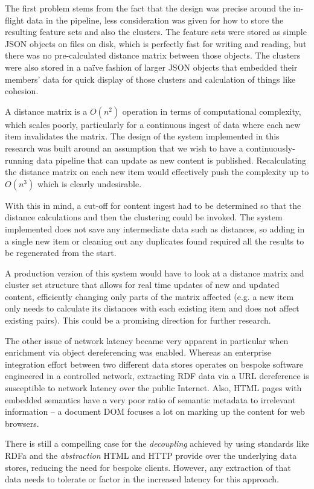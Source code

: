 The first problem stems from the fact that the design was precise
around the in-flight data in the pipeline, less consideration was
given for how to store the resulting feature sets and also the
clusters. The feature sets were stored as simple JSON objects on
files on disk, which is perfectly fast for writing and reading, but
there was no pre-calculated distance matrix between those objects. The
clusters were also stored in a na\"ive fashion of larger JSON objects
that embedded their members' data for quick display of those clusters
and calculation of things like cohesion.

A distance matrix is a $O(n^2)$ operation in terms of computational
complexity, which scales poorly, particularly for a continuous ingest
of data where each new item invalidates the matrix. The design of
the system implemented in this research was built around an assumption
that we wish to have a continuously-running data pipeline that can
update as new content is published. Recalculating the distance matrix
on each new item would effectively push the complexity up to $O(n^3)$
which is clearly undesirable.

With this in mind, a cut-off for content ingest had to be determined
so that the distance calculations and then the clustering could be
invoked. The system implemented does not save any intermediate data
such as distances, so adding in a single new item or cleaning out
any duplicates found required all the results to be regenerated from
the start.

A production version of this system would have to look at a distance
matrix and cluster set structure that allows for real time updates
of new and updated content, efficiently changing only parts of the
matrix affected (e.g. a new item only needs to calculate its distances
with each existing item and does not affect existing pairs). This
could be a promising direction for further research.

The other issue of network latency became very apparent in particular
when enrichment via object dereferencing was enabled. Whereas an
enterprise integration effort between two different data stores
operates on bespoke software engineered in a controlled network,
extracting RDF data via a URL dereference is susceptible to network
latency over the public Internet. Also, HTML pages with embedded
semantics have a very poor ratio of semantic metadata to irrelevant
information -- a document DOM focuses a lot on marking up the content
for web browsers.

There is still a compelling case for the \emph{decoupling} achieved
by using standards like RDFa and the \emph{abstraction} HTML and HTTP
provide over the underlying data stores, reducing the need for
bespoke clients. However, any extraction of that data needs to
tolerate or factor in the increased latency for this approach.

